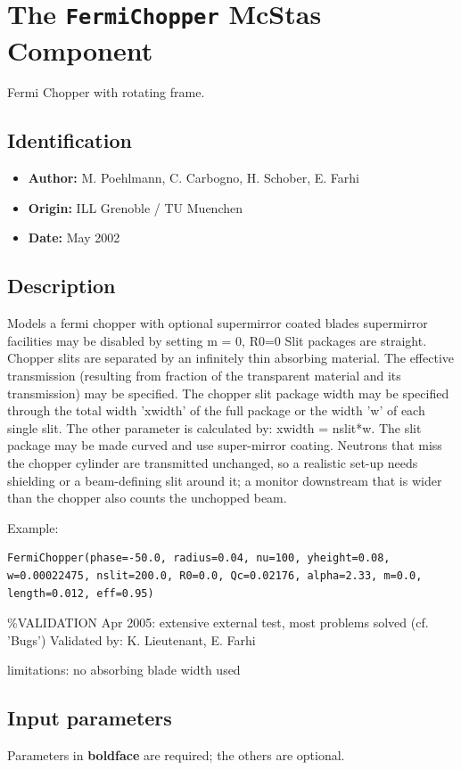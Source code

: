 \section{The \texttt{FermiChopper} McStas Component}
Fermi Chopper with rotating frame.

\subsection*{Identification}
\begin{itemize}
  \item \textbf{Author:} M. Poehlmann, C. Carbogno, H. Schober, E. Farhi
  \item \textbf{Origin:} ILL Grenoble / TU Muenchen
  \item \textbf{Date:} May 2002
\end{itemize}

\subsection*{Description}
Models a fermi chopper with optional supermirror coated blades supermirror facilities may be disabled by setting m = 0, R0=0 Slit packages are straight. Chopper slits are separated by an infinitely thin absorbing material. The effective transmission (resulting from fraction of the transparent material and its transmission) may be specified. The chopper slit package width may be specified through the total width 'xwidth' of the full package or the width 'w' of each single slit. The other parameter is calculated by: xwidth = nslit*w. The slit package may be made curved and use super-mirror coating. Neutrons that miss the chopper cylinder are transmitted unchanged, so a realistic set-up needs shielding or a beam-defining slit around it; a monitor downstream that is wider than the chopper also counts the unchopped beam.

Example:

\begin{verbatim}
FermiChopper(phase=-50.0, radius=0.04, nu=100, yheight=0.08, w=0.00022475, nslit=200.0, R0=0.0, Qc=0.02176, alpha=2.33, m=0.0, length=0.012, eff=0.95)
\end{verbatim}

\%VALIDATION Apr 2005: extensive external test, most problems solved (cf. 'Bugs') Validated by: K. Lieutenant, E. Farhi

limitations: no absorbing blade width used

\subsection*{Input parameters}
Parameters in \textbf{boldface} are required; the others are optional.

